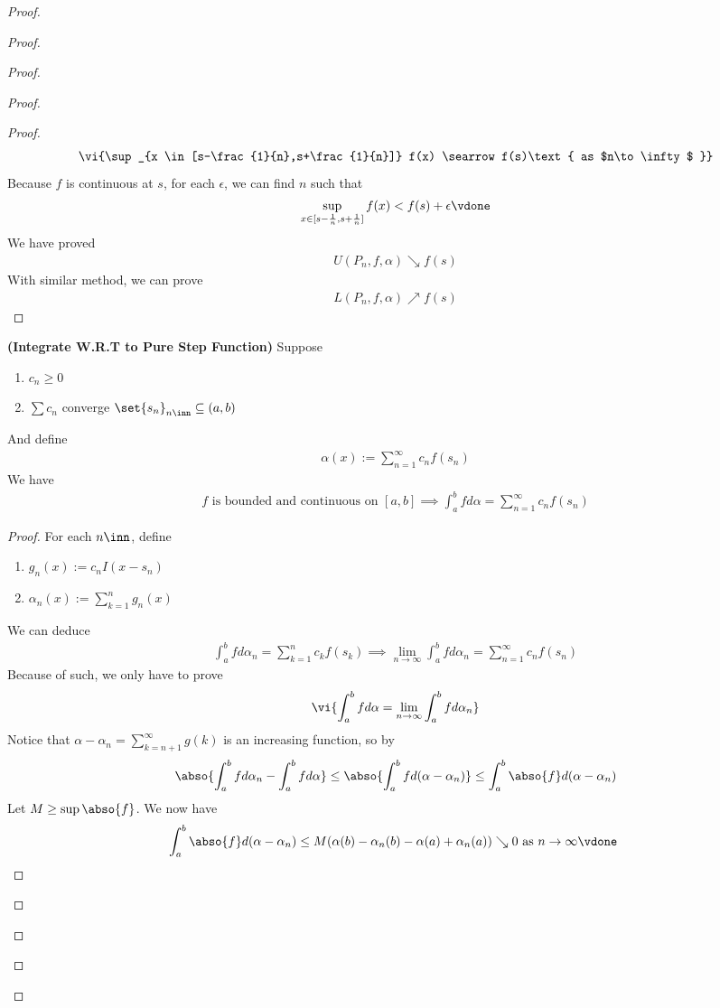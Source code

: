 \documentclass{report}
\begin{document}
\begin{proof}
\begin{proof}
\begin{proof}
\begin{proof}
\begin{proof}
\begin{align*}
  \vi{\sup_{x \in [s-\frac{1}{n},s+\frac{1}{n}]} f(x) \searrow f(s)\text{ as $n\to \infty$ }}
\end{align*}
Because $f$ is continuous at  $s$, for each  $\epsilon $, we can find $n$ such that 
 \begin{align*}
\sup_{x \in [s-\frac{1}{n},s+\frac{1}{n}]}f(x)<f(s)+\epsilon \vdone
\end{align*}
We have proved 
\begin{align*}
U(P_n,f,\alpha ) \searrow f(s)
\end{align*}
With similar method, we can prove 
\begin{align*}
L(P_n,f,\alpha )\nearrow f(s)
\end{align*}

\end{proof}
\begin{theorem}
\label{7.2.4}
\textbf{(Integrate W.R.T to Pure Step Function)} Suppose 
\begin{enumerate}[label=(\alph*)]
  \item $c_n\geq 0$ 
  \item $\sum c_n$ converge 
  $\set{s_n}_{n\inn} \subseteq (a,b)$
\end{enumerate}
And define 
\begin{align*}
\alpha (x):=\sum_{n=1}^\infty c_n f(s_n)
\end{align*}
We have 
\begin{align*}
f\text{ is bounded and continuous on } [a,b]\implies \int_a^b fd\alpha =\sum_{n=1}^\infty c_n f(s_n)
\end{align*}
\end{theorem}
\begin{proof}
For each $n\inn$, define 
\begin{enumerate}[label=(\alph*)]
  \item $g_n(x):=c_nI(x-s_n)$ 
  \item  $\alpha _n(x):=\sum_{k=1}^n g_n(x)$
\end{enumerate}
We can deduce
\begin{align*}
\int_a^b fd\alpha_n = \sum_{k=1}^n c_k f(s_k) \implies \lim_{n \to \infty}\int_a^b fd\alpha_n =\sum_{n=1}^\infty c_n f(s_n)
\end{align*}
Because of such, we only have to prove 
\begin{align*}
  \vi{\int_a^b fd\alpha =\lim_{n \to \infty} \int_a^b fd\alpha_n}
\end{align*}
Notice that $\alpha -\alpha _n =\sum_{k=n+1}^\infty g(k)$ is an increasing function, so by  
\begin{align*}
  \abso{\int_a^b fd\alpha_n -\int_a^bfd\alpha }\leq \abso{\int_a^b fd (\alpha -\alpha_n)}\leq \int_a^b \abso{f}d(\alpha -\alpha _n)
\end{align*}
Let $M\geq \sup \abso{f}$. We now have 
\begin{align*}
\int_a^b \abso{f}d(\alpha -\alpha _n) \leq  M (\alpha (b)-\alpha _n(b)-\alpha (a)+\alpha _n(a)) \searrow 0\text{ as $n \to \infty\vdone$ }
\end{align*}



\end{proof}
\end{proof}
\end{proof}
\end{proof}
\end{proof}
\end{document}
